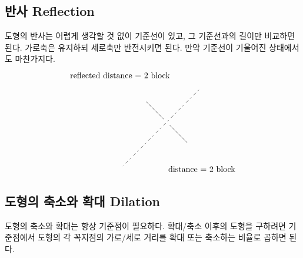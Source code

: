 \documentclass{article}
\begin{document}
\subsection{반사 Reflection}
도형의 반사는 어렵게 생각할 것 없이 기준선이 있고, 그 기준선과의 길이만 비교하면 된다. 가로축은 유지하되 세로축만 반전시키면 된다. 만약 기준선이 기울어진 상태에서도 마찬가지다.
$$
\begin{tikzpicture}

\node (v1) at (-2,-2) {};
\node (v2) at (1.5,1.5) {};
\node (v5) at (1,-1) {};
\node (v4) at (0,0) {};
\node (v3) at (-1,1) {};
\draw  (v3) edge (v4);
\draw  (v5) edge (v4);
\node at (1.5,-2) {distance = 2 block};
\draw [dash pattern=on 2pt off 3pt on 4pt off 4pt] (v2) edge (v1);
\node at (-2,2) {reflected distance = 2 block};
\end{tikzpicture}
$$
\subsection{도형의 축소와 확대 Dilation}
도형의 축소와 확대는 항상 기준점이 필요하다. 확대/축소 이후의 도형을 구하려면 기준점에서 도형의 각 꼭지점의 가로/세로 거리를 확대 또는 축소하는 비율로 곱하면 된다.
\end{document}
